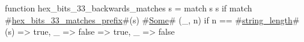 function hex_bits_33_backwards_matches s = match s {
  s if match #\hyperref[sailRISCVzhexzybitszy33zymatcheszyprefix]{hex\_bits\_33\_matches\_prefix}#(s) {
    #\hyperref[sailRISCVzSome]{Some}# (_, n) if n == #\hyperref[sailRISCVzstringzylength]{string\_length}#(s) => true,
    _ => false
  } => true,
  _ => false
}
